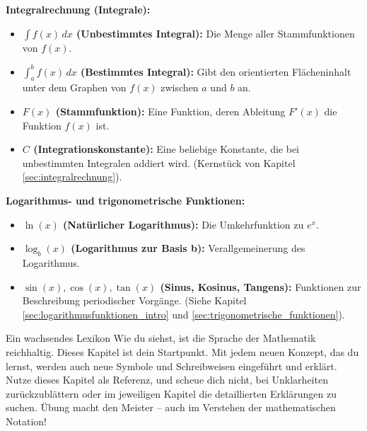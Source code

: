 \textbf{Integralrechnung (Integrale):}
\begin{itemize}
    \item \textbf{$\int f(x) \,dx$ (Unbestimmtes Integral):} Die Menge aller Stammfunktionen von $f(x)$.
    \item \textbf{$\int_a^b f(x) \,dx$ (Bestimmtes Integral):} Gibt den orientierten Flächeninhalt unter dem Graphen von $f(x)$ zwischen $a$ und $b$ an.
    \item \textbf{$F(x)$ (Stammfunktion):} Eine Funktion, deren Ableitung $F'(x)$ die Funktion $f(x)$ ist.
    \item \textbf{$C$ (Integrationskonstante):} Eine beliebige Konstante, die bei unbestimmten Integralen addiert wird.
    (Kernstück von Kapitel \ref{sec:integralrechnung}).
\end{itemize}

\textbf{Logarithmus- und trigonometrische Funktionen:}
\begin{itemize}
    \item \textbf{$\ln(x)$ (Natürlicher Logarithmus):} Die Umkehrfunktion zu $e^x$.
    \item \textbf{$\log_b(x)$ (Logarithmus zur Basis b):} Verallgemeinerung des Logarithmus.
    \item \textbf{$\sin(x), \cos(x), \tan(x)$ (Sinus, Kosinus, Tangens):} Funktionen zur Beschreibung periodischer Vorgänge.
    (Siehe Kapitel \ref{sec:logarithmusfunktionen_intro} und \ref{sec:trigonometrische_funktionen}).
\end{itemize}

\begin{infoboxumgebung}{Ein wachsendes Lexikon}
Wie du siehst, ist die Sprache der Mathematik reichhaltig. Dieses Kapitel ist dein Startpunkt. Mit jedem neuen Konzept, das du lernst, werden auch neue Symbole und Schreibweisen eingeführt und erklärt. Nutze dieses Kapitel als Referenz, und scheue dich nicht, bei Unklarheiten zurückzublättern oder im jeweiligen Kapitel die detaillierten Erklärungen zu suchen. Übung macht den Meister – auch im Verstehen der mathematischen Notation!
\end{infoboxumgebung}

\bigskip
